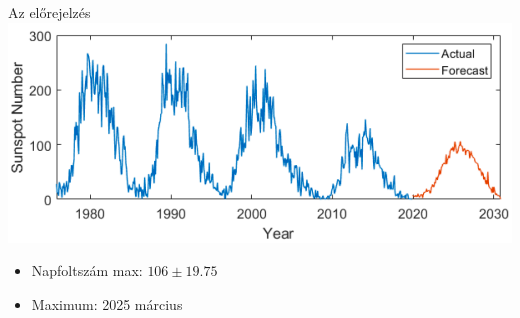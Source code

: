 \begin{frame}{Az előrejelzés}
    \centering
    \includegraphics[width=1.0\textwidth]{figures/forecasting_solar_cycle.png}
    \begin{itemize}
        \item Napfoltszám max: $106 \pm 19.75$
        \item Maximum: 2025 március
    \end{itemize}
\end{frame}
